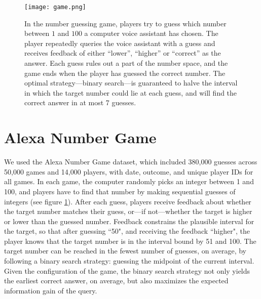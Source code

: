 \documentclass[10pt,letterpaper]{article}
\begin{document}
\begin{figure}[t]
    \texttt{[image: game.png]}
    \vspace{-8mm}
    \caption{In the number guessing game, players try to guess which number between $1$ and $100$ a computer voice assistant has chosen.  The player repeatedly queries the voice assistant with a guess and receives feedback of either \enquote{lower}, \enquote{higher} or \enquote{correct} as the answer. Each guess rules out a part of the number space, and the game ends when the player has guessed the correct number.  
    The optimal strategy---binary search---is guaranteed to halve the interval in which the target number could lie at each guess, and will find the correct answer in at most 7 guesses.
    }
    \label{fig:the_game}
    \vspace{-2mm}
\end{figure}



\section{Alexa Number Game}

We used the Alexa Number Game dataset, which included 380,000 guesses across 50,000 games and 14,000 players, with date, outcome, and unique player IDs for all games. 
In each game, the computer randomly picks an integer between 1 and 100, and players have to find that number by making sequential guesses of integers  (see figure \ref{fig:the_game}).
After each guess, players receive feedback about whether the target number matches their guess, or---if not---whether the target is higher or lower than the guessed number.  
Feedback constrains the plausible interval for the target, so that after guessing ``50", and receiving the feedback ``higher", the player knows that the target number is in the interval bound by 51 and 100.
The target number can be reached in the fewest number of guesses, on average, by following a binary search strategy: guessing the midpoint of the current interval. 
Given the configuration of the game, the binary search strategy not only yields the earliest correct answer, on average, but also maximizes the expected information gain of the query.
\end{document}
